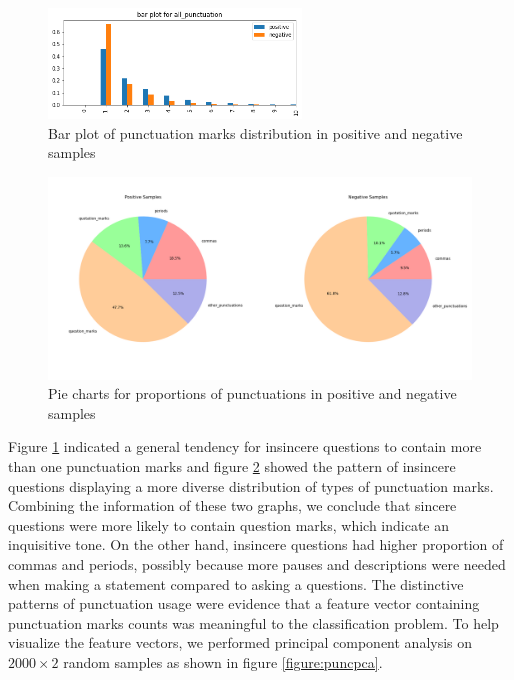 \documentclass[12pt]{diazessay} %
\begin{document}
\begin{figure}[ht]
    \includegraphics[width=0.6\textwidth, center]{graphs/bar_punc/1.png}
    \caption{Bar plot of punctuation marks distribution in positive and negative samples}
    \label{figure:puncbar}
\end{figure}

\begin{figure}[ht] 
    \includegraphics[width=\textwidth, center]{graphs/puncpiecharts.png}
    \caption{Pie charts for proportions of punctuations in positive and negative samples}
    \medskip
    \small
    \label{figure:puncpie}
\end{figure}


Figure \ref{figure:puncbar} indicated a general tendency for insincere questions to contain more than one punctuation marks and figure \ref{figure:puncpie} showed the pattern of insincere questions displaying a more diverse distribution of types of punctuation marks. Combining the information of these two graphs, we conclude that sincere questions were more likely to contain question marks, which indicate an inquisitive tone. On the other hand, insincere questions had higher proportion of commas and periods, possibly because more pauses and descriptions were needed when making a statement compared to asking a questions. The distinctive patterns of punctuation usage were evidence that a feature vector containing punctuation marks counts was meaningful to the classification problem. To help visualize the feature vectors, we performed principal component analysis on $2000 \times 2$ random samples as shown in figure \ref{figure:puncpca}.
\end{document}
